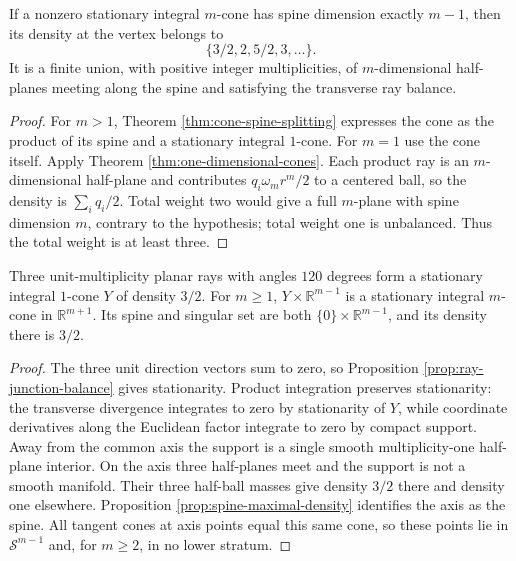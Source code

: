 \begin{corollary}\label{cor:classical-cone-density}
If a nonzero stationary integral $m$-cone has spine dimension exactly $m-1$, then its density at the vertex belongs to
\[
 \{3/2,2,5/2,3,\ldots\}.
\]
It is a finite union, with positive integer multiplicities, of $m$-dimensional half-planes meeting along the spine and satisfying the transverse ray balance.
\end{corollary}
\begin{proof}
For $m>1$, Theorem \ref{thm:cone-spine-splitting} expresses the cone as the product of its spine and a stationary integral $1$-cone. For $m=1$ use the cone itself. Apply Theorem \ref{thm:one-dimensional-cones}. Each product ray is an $m$-dimensional half-plane and contributes $q_i\omega_mr^m/2$ to a centered ball, so the density is $\sum_iq_i/2$. Total weight two would give a full $m$-plane with spine dimension $m$, contrary to the hypothesis; total weight one is unbalanced. Thus the total weight is at least three.
\end{proof}

\begin{example}\label{ex:triple-junction-products}
Three unit-multiplicity planar rays with angles $120$ degrees form a stationary integral $1$-cone $Y$ of density $3/2$. For $m\geq1$, $Y\times\mathbb R^{m-1}$ is a stationary integral $m$-cone in $\mathbb R^{m+1}$. Its spine and singular set are both $\{0\}\times\mathbb R^{m-1}$, and its density there is $3/2$.
\end{example}
\begin{proof}
The three unit direction vectors sum to zero, so Proposition \ref{prop:ray-junction-balance} gives stationarity. Product integration preserves stationarity: the transverse divergence integrates to zero by stationarity of $Y$, while coordinate derivatives along the Euclidean factor integrate to zero by compact support. Away from the common axis the support is a single smooth multiplicity-one half-plane interior. On the axis three half-planes meet and the support is not a smooth manifold. Their three half-ball masses give density $3/2$ there and density one elsewhere. Proposition \ref{prop:spine-maximal-density} identifies the axis as the spine. All tangent cones at axis points equal this same cone, so these points lie in $\mathcal S^{m-1}$ and, for $m\geq2$, in no lower stratum.
\end{proof}

